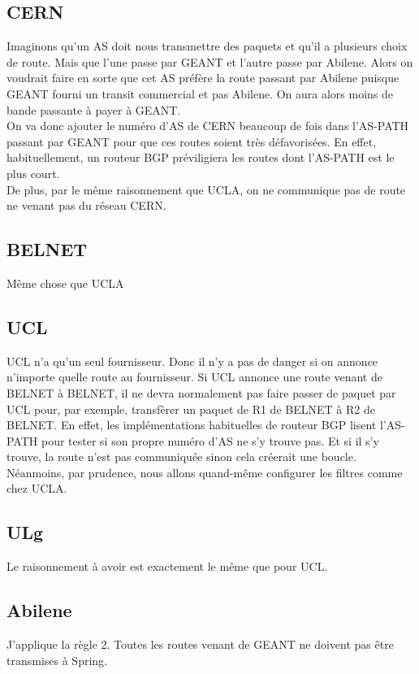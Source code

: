 \documentclass[a4paper, 12pt]{article}
\begin{document}
\subsection{CERN}
Imaginons qu'un AS doit nous transmettre des paquets et qu'il a plusieurs choix de route.
Mais que l'une passe par GEANT et l'autre passe par Abilene.
Alors on voudrait faire en sorte que cet AS préfère la route passant par Abilene puisque GEANT fourni un transit commercial et pas Abilene.
On aura alors moins de bande passante à payer à GEANT.
\\

On va donc ajouter le numéro d'AS de CERN beaucoup de fois dans l'AS-PATH passant par GEANT pour que ces routes soient très défavorisées.
En effet, habituellement, un routeur BGP préviligiera les routes dont l'AS-PATH est le plus court. 
\\

De plus, par le même raisonnement que UCLA, on ne communique pas de route ne venant pas du réseau CERN.

\subsection{BELNET}
Même chose que UCLA

\subsection{UCL}
UCL n'a qu'un seul fournisseur. Donc il n'y a pas de danger si on annonce n'importe quelle route au fournisseur.
Si UCL annonce une route venant de BELNET à BELNET, il ne devra normalement pas faire passer de paquet par UCL pour, par exemple, transfèrer un paquet de R1 de BELNET à R2 de BELNET.
En effet, les implémentations habituelles de routeur BGP lisent l'AS-PATH pour tester si son propre numéro d'AS ne s'y trouve pas.
Et si il s'y trouve, la route n'est pas communiquée sinon cela créerait une boucle.
Néanmoins, par prudence, nous allons quand-même configurer les filtres comme chez UCLA.

\subsection{ULg}
Le raisonnement à avoir est exactement le même que pour UCL.

\subsection{Abilene}
J'applique la règle 2. Toutes les routes venant de GEANT ne doivent pas être transmises à Spring.
\end{document}
